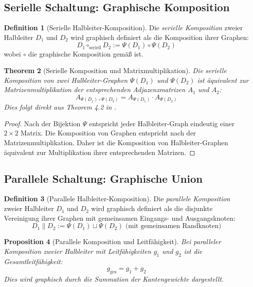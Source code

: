 \documentclass[12pt, a4paper]{article}
\newtheorem{theorem}{Theorem}[section]
\newtheorem{proposition}[theorem]{Proposition}
\theoremstyle{definition}
\newtheorem{definition}[theorem]{Definition}
\theoremstyle{remark}
\begin{document}
\subsection{Serielle Schaltung: Graphische Komposition}
\label{subsec:serielle_komposition}

\begin{definition}[Serielle Halbleiter-Komposition]
\label{def:serielle_komposition}
Die \emph{serielle Komposition} zweier Halbleiter $D_1$ und $D_2$ wird graphisch definiert als die Komposition ihrer Graphen:
\[
  D_1 \circ_{\mathrm{seriell}} D_2 := \Psi(D_1) \circ \Psi(D_2)
\]
wobei $\circ$ die graphische Komposition gemäß \cite{epp2026matrgraph} ist.
\end{definition}

\begin{theorem}[Serielle Komposition und Matrixmultiplikation]
\label{thm:serielle_komposition_matrix}
Die serielle Komposition von zwei Halbleiter-Graphen $\Psi(D_1)$ und $\Psi(D_2)$ ist äquivalent zur Matrizenmultiplikation der entsprechenden Adjazenzmatrizen $A_1$ und $A_2$:
\[
  A_{\Psi(D_1) \circ \Psi(D_2)} = A_{\Psi(D_1)} \cdot A_{\Psi(D_2)}
\]
Dies folgt direkt aus Theorem 4.2 in \cite{epp2026matrgraph}.
\end{theorem}

\begin{proof}
Nach der Bijektion $\Psi$ entspricht jeder Halbleiter-Graph eindeutig einer $2 \times 2$ Matrix. Die Komposition von Graphen entspricht nach \cite{epp2026matrgraph} der Matrizenmultiplikation. Daher ist die Komposition von Halbleiter-Graphen äquivalent zur Multiplikation ihrer entsprechenden Matrizen.
\end{proof}

\subsection{Parallele Schaltung: Graphische Union}
\label{subsec:parallele_komposition}

\begin{definition}[Parallele Halbleiter-Komposition]
\label{def:parallele_komposition}
Die \emph{parallele Komposition} zweier Halbleiter $D_1$ und $D_2$ wird graphisch definiert als die disjunkte Vereinigung ihrer Graphen mit gemeinsamen Eingangs- und Ausgangsknoten:
\[
  D_1 \parallel D_2 := \Psi(D_1) \sqcup \Psi(D_2) \text{ (mit gemeinsamen Randknoten)}
\]
\end{definition}

\begin{proposition}[Parallele Komposition und Leitfähigkeit]
\label{prop:parallele_komposition_leitfaehigkeit}
Bei paralleler Komposition zweier Halbleiter mit Leitfähigkeiten $g_1$ und $g_2$ ist die Gesamtleitfähigkeit:
\[
  g_{\mathrm{ges}} = g_1 + g_2
\]
Dies wird graphisch durch die Summation der Kantengewichte dargestellt.
\end{proposition}
\end{document}

